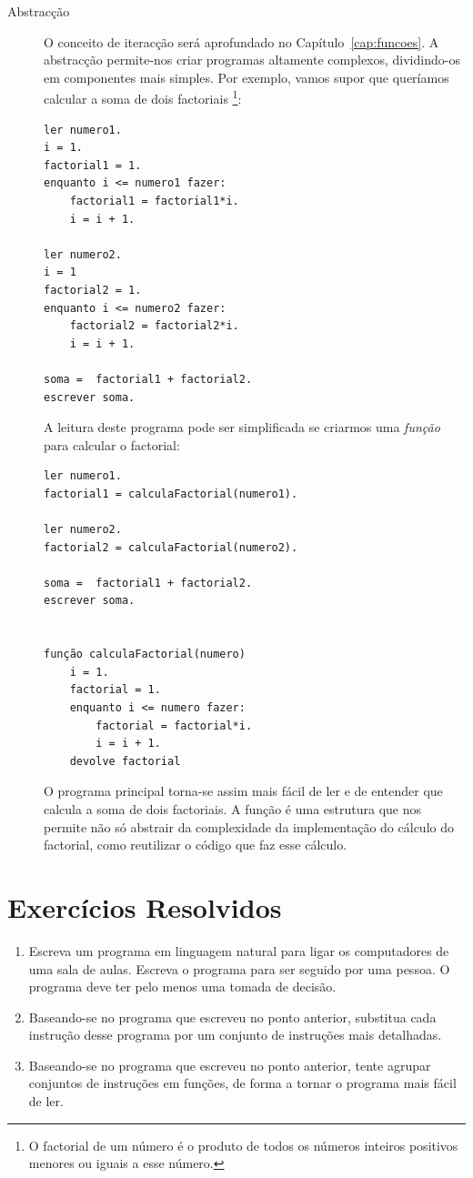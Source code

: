\begin{description}
\item[Abstracção] O conceito de iteracção será aprofundado no Capítulo~\ref{cap:funcoes}. A abstracção permite-nos criar programas altamente complexos, dividindo-os em componentes mais simples. Por exemplo, vamos supor que queríamos calcular a soma de dois factoriais%
\footnote{O factorial de um número é o produto de todos os números inteiros positivos menores ou iguais a esse número.}:
\begin{lstlisting} 
ler numero1.
i = 1.
factorial1 = 1.
enquanto i <= numero1 fazer:
	factorial1 = factorial1*i.
	i = i + 1.

ler numero2.
i = 1
factorial2 = 1.
enquanto i <= numero2 fazer:
	factorial2 = factorial2*i.
	i = i + 1.

soma =  factorial1 + factorial2.
escrever soma.
\end{lstlisting}
A leitura deste programa pode ser simplificada se criarmos uma \emph{função} para calcular o factorial:
\begin{lstlisting} 
ler numero1.
factorial1 = calculaFactorial(numero1).

ler numero2.
factorial2 = calculaFactorial(numero2).

soma =  factorial1 + factorial2.
escrever soma.


função calculaFactorial(numero) 
	i = 1.
	factorial = 1.
	enquanto i <= numero fazer:
		factorial = factorial*i.
		i = i + 1.
	devolve factorial

\end{lstlisting}
O programa principal torna-se assim mais fácil de ler e de entender que calcula a soma de dois factoriais. A função é uma estrutura que nos permite não só abstrair da complexidade da implementação do cálculo do factorial, como reutilizar o código que faz esse cálculo.
\end{description}



\section{Exercícios Resolvidos}

\begin{enumerate}
	\item \label{exe:1_1} Escreva um programa em linguagem natural para ligar os computadores de uma sala de aulas. Escreva o programa para ser seguido por uma pessoa. O programa deve ter pelo menos uma tomada de decisão.
	
	\item \label{exe:1_2} Baseando-se no programa que escreveu no ponto anterior, substitua cada instrução desse programa por um conjunto de instruções mais detalhadas.
	
	\item \label{exe:1_3} Baseando-se no programa que escreveu no ponto anterior, tente agrupar conjuntos de instruções em funções, de forma a tornar o programa mais fácil de ler.
\end{enumerate}



